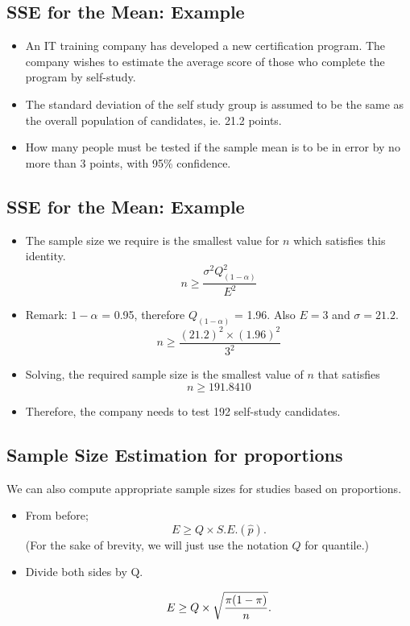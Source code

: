 \documentclass[]{report}
\begin{document}

\subsection{SSE for the Mean: Example}

\begin{itemize}
\item An IT training company has developed a new certification program. The company wishes to estimate the average score of those who complete the program by self-study.  \item The standard deviation of the self study group is assumed to be the same as the overall population of candidates, ie. 21.2 points.
\item How many people must be tested if the sample mean is to be in error by no more than 3 points, with 95\% confidence.
\end{itemize}


\subsection{SSE for the Mean: Example}

\begin{itemize}
\item The sample size we require is the smallest value for $n$ which satisfies this identity.
\[ n \geq \frac{\sigma^2 Q^2_{(1-\alpha)}}{E^2}  \]
\item Remark: $1-\alpha$ = 0.95, therefore $Q_{(1-\alpha)}$ = 1.96. Also $E=3$ and $\sigma =21.2$.
\[ n \geq \frac{(21.2)^2 \times (1.96)^2}{3^2} \]
\item Solving, the required sample size is the smallest value of $n$ that satisfies
\[ n \geq 191.8410 \]
\item Therefore, the company needs to test 192 self-study candidates.
\end{itemize}



\subsection{Sample Size Estimation for proportions}
We can also compute appropriate sample sizes for studies based on proportions.
\begin{itemize}
\item From before; \[ E \geq Q \times S.E.(\hat{p}). \]
(For the sake of brevity, we will just use the notation $Q$ for quantile.)

\item Divide both sides by Q.

\[ E \geq Q \times \sqrt{ {\pi(1-\pi)  \over n} }. \]

\end{itemize}
\end{document}
